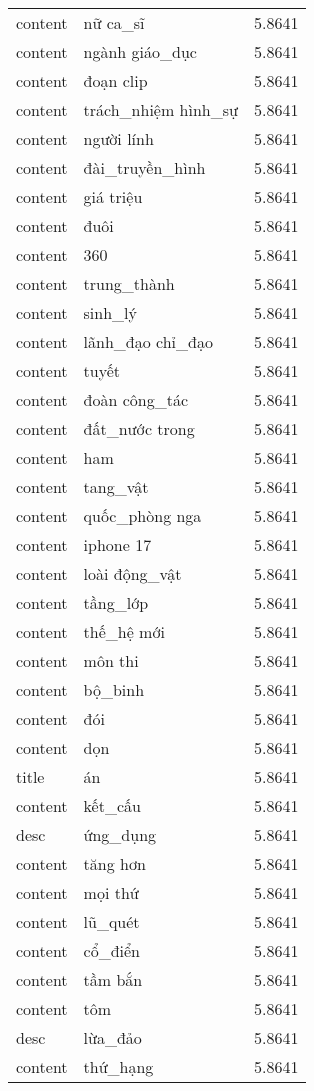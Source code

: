 \documentclass{article}
\begin{document}
\begin{tabular}{lll}
content & nữ ca\_sĩ & 5.8641\\
content & ngành giáo\_dục & 5.8641\\
content & đoạn clip & 5.8641\\
content & trách\_nhiệm hình\_sự & 5.8641\\
content & người lính & 5.8641\\
content & đài\_truyền\_hình & 5.8641\\
content & giá triệu & 5.8641\\
content & đuôi & 5.8641\\
content & 360 & 5.8641\\
content & trung\_thành & 5.8641\\
content & sinh\_lý & 5.8641\\
content & lãnh\_đạo chỉ\_đạo & 5.8641\\
content & tuyết & 5.8641\\
content & đoàn công\_tác & 5.8641\\
content & đất\_nước trong & 5.8641\\
content & ham & 5.8641\\
content & tang\_vật & 5.8641\\
content & quốc\_phòng nga & 5.8641\\
content & iphone 17 & 5.8641\\
content & loài động\_vật & 5.8641\\
content & tầng\_lớp & 5.8641\\
content & thế\_hệ mới & 5.8641\\
content & môn thi & 5.8641\\
content & bộ\_binh & 5.8641\\
content & đói & 5.8641\\
content & dọn & 5.8641\\
title & án & 5.8641\\
content & kết\_cấu & 5.8641\\
desc & ứng\_dụng & 5.8641\\
content & tăng hơn & 5.8641\\
content & mọi thứ & 5.8641\\
content & lũ\_quét & 5.8641\\
content & cổ\_điển & 5.8641\\
content & tầm bắn & 5.8641\\
content & tôm & 5.8641\\
desc & lừa\_đảo & 5.8641\\
content & thứ\_hạng & 5.8641\\

\end{tabular}
\end{document}
